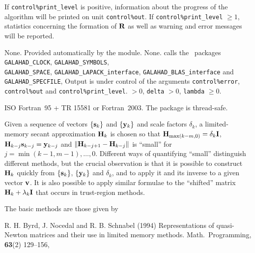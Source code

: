 \documentclass{galahad}
\newcommand{\packagename}{LMS}
\begin{document}

\galinfo
If {\tt control\%print\_level} is positive, information about the progress
of the algorithm will be printed on unit {\tt control\-\%out}.
If {\tt control\%print\_level} $\geq 1$, statistics concerning the
formation of ${\mathbf{R}}$
as well as warning and error messages will be reported.


\galgeneral

\galcommon None.
\galworkspace Provided automatically by the module.
\galroutines None.
\galmodules {\tt \packagename} calls the \galahad\ packages
{\tt GALAHAD\_CLOCK},
{\tt GALAHAD\_SY\-M\-BOLS}, \\
{\tt GALAHAD\-\_SPACE},
{\tt GALAHAD\_LAPACK\_interface},
{\tt GALAHAD\_BLAS\_interface} and
{\tt GALAHAD\_SPECFILE},
\galio Output is under control of the arguments
 {\tt control\%error}, {\tt control\%out} and {\tt control\%print\_level}.
 $> 0$, {\tt delta} $> 0$, {\tt lambda} $\geq 0$.

\galportability ISO Fortran~95 + TR 15581 or Fortran~2003.
The package is thread-safe.



\galmethod

Given a sequence of vectors $\{{\mathbf{s}}_k\}$ and $\{{\mathbf{y}}_k\}$ and scale factors
$\delta_k$, a limited-memory secant approximation ${\mathbf{H}}_k$ is chosen so that
${\mathbf{H}}_{\max(k-m,0)} = \delta_k {\mathbf{I}}$, ${\mathbf{H}}_{k-j} {\mathbf{s}}_{k-j} = {\mathbf{y}}_{k-j}$
and $\| {\mathbf{H}}_{k-j+1} - {\mathbf{H}}_{k-j}\|$ is ``small'' for
$j = \min(k-1,m-1), \ldots, 0$.
Different ways of quantifying ``small'' distinguish different methods,
but the crucial
observation is that it is possible to construct ${\mathbf{H}}_k$ quickly from
$\{{\mathbf{s}}_k\}$, $\{{\mathbf{y}}_k\}$ and $\delta_k$, and to apply it and its inverse
to a given vector ${\mathbf{v}}$. It is also possible to apply similar formulae
to the ``shifted'' matrix ${\mathbf{H}}_k + \lambda_k {\mathbf{I}}$ that occurs in
trust-region methods.

\noindent
The basic methods are those given by
\vspace*{1mm}

\noindent
R. H. Byrd, J. Nocedal and R. B. Schnabel (1994)
Representations of quasi-Newton matrices and their use in
limited memory methods.
Math.\ Programming,  {\bf 63}(2) 129--156,
\vspace*{1mm}
\end{document}

